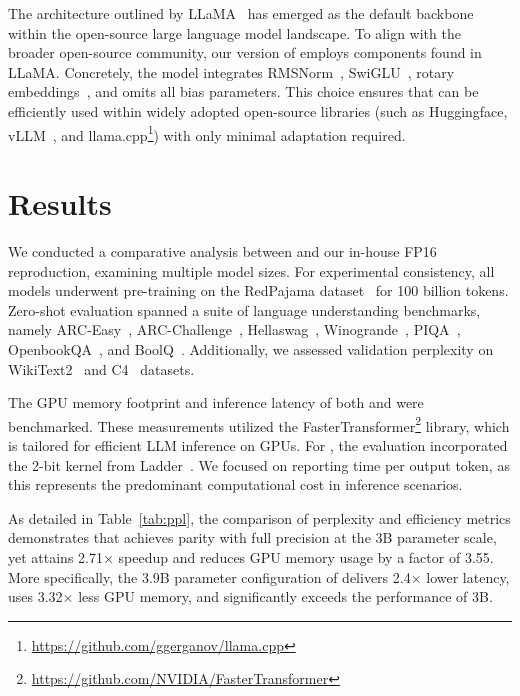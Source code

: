 The architecture outlined by LLaMA~\cite{llama, llama2} has emerged as the default backbone within the open-source large language model landscape. To align with the broader open-source community, our version of  employs components found in LLaMA. Concretely, the model integrates RMSNorm~\cite{rmsnorm}, SwiGLU~\cite{swiglu}, rotary embeddings~\cite{rope}, and omits all bias parameters. This choice ensures that  can be efficiently used within widely adopted open-source libraries (such as Huggingface, vLLM~\cite{vllm}, and llama.cpp\footnote{\url{https://github.com/ggerganov/llama.cpp}}) with only minimal adaptation required.

\section{Results}

We conducted a comparative analysis between  and our in-house FP16  reproduction, examining multiple model sizes. For experimental consistency, all models underwent pre-training on the RedPajama dataset~\cite{redpajama} for 100 billion tokens. Zero-shot evaluation spanned a suite of language understanding benchmarks, namely ARC-Easy~\cite{arc}, ARC-Challenge~\cite{arc}, Hellaswag~\cite{hellaswag}, Winogrande~\cite{winoGrande}, PIQA~\cite{piqa}, OpenbookQA~\cite{openbookqa}, and BoolQ~\cite{boolq}. Additionally, we assessed validation perplexity on WikiText2~\cite{wikitext2} and C4~\cite{c4} datasets.

The GPU memory footprint and inference latency of both  and  were benchmarked. These measurements utilized the FasterTransformer\footnote{\url{https://github.com/NVIDIA/FasterTransformer}} library, which is tailored for efficient LLM inference on GPUs. For , the evaluation incorporated the 2-bit kernel from Ladder~\cite{ladder}. We focused on reporting time per output token, as this represents the predominant computational cost in inference scenarios.

As detailed in Table~\ref{tab:ppl}, the comparison of perplexity and efficiency metrics demonstrates that  achieves parity with full precision  at the 3B parameter scale, yet attains 2.71$\times$ speedup and reduces GPU memory usage by a factor of 3.55. More specifically, the 3.9B parameter configuration of  delivers 2.4$\times$ lower latency, uses 3.32$\times$ less GPU memory, and significantly exceeds the performance of  3B.

